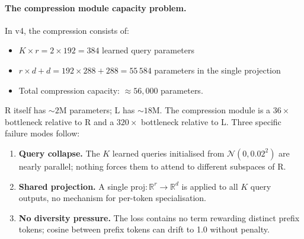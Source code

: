 \documentclass[11pt, a4paper]{article}
\theoremstyle{plain}
\theoremstyle{definition}
\theoremstyle{remark}
\begin{document}
\paragraph{The compression module capacity problem.}
In v4, the compression consists of:
\begin{itemize}[nosep]
\item $K \times r = 2 \times 192 = 384$ learned query parameters
\item $r \times d + d = 192 \times 288 + 288 = 55\,584$ parameters in the single projection
\item Total compression capacity: $\approx 56{,}000$ parameters.
\end{itemize}
R itself has $\sim 2$M parameters; L has $\sim 18$M.
The compression module is a $36\times$ bottleneck relative to R and a $320\times$ bottleneck relative to L.
Three specific failure modes follow:
\begin{enumerate}[nosep]
\item \textbf{Query collapse.} The $K$ learned queries initialised from $\mathcal{N}(0, 0.02^2)$ are nearly parallel; nothing forces them to attend to different subspaces of R.
\item \textbf{Shared projection.} A single $\mathrm{proj}: \mathbb{R}^r \to \mathbb{R}^d$ is applied to all $K$ query outputs, no mechanism for per-token specialisation.
\item \textbf{No diversity pressure.} The loss contains no term rewarding distinct prefix tokens; cosine between prefix tokens can drift to 1.0 without penalty.
\end{enumerate}
\end{document}
